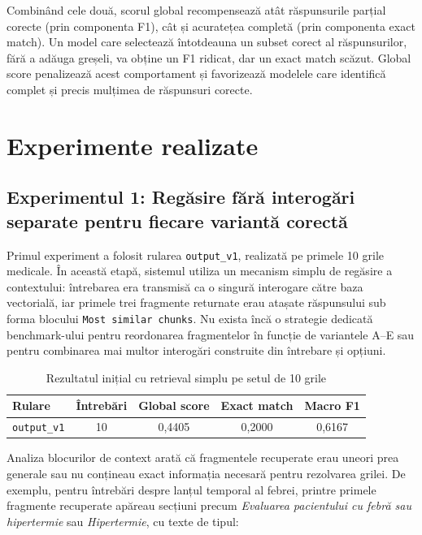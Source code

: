 \documentclass[12pt, a4paper, oneside, romanian]{teza-upb}
\begin{document}
Combinând cele două, scorul global recompensează atât răspunsurile parțial corecte (prin componenta F1), cât și acuratețea completă (prin componenta exact match). Un model care selectează întotdeauna un subset corect al răspunsurilor, fără a adăuga greșeli, va obține un F1 ridicat, dar un exact match scăzut. Global score penalizează acest comportament și favorizează modelele care identifică complet și precis mulțimea de răspunsuri corecte.




\section{Experimente realizate}


\subsection{Experimentul 1: Regăsire fără interogări separate pentru fiecare variantă corectă}

Primul experiment a folosit rularea \texttt{output\_v1}, realizată pe primele 10 grile medicale. În această etapă, sistemul utiliza un mecanism simplu de regăsire a contextului: întrebarea era transmisă ca o singură interogare către baza vectorială, iar primele trei fragmente returnate erau atașate răspunsului sub forma blocului \texttt{Most similar chunks}. Nu exista încă o strategie dedicată benchmark-ului pentru reordonarea fragmentelor în funcție de variantele A--E sau pentru combinarea mai multor interogări construite din întrebare și opțiuni.

\begin{table}[H]
\centering
\label{tab:experiment_initial_retrieval_v1}
\small
\begin{tabular}{lcccc}
\toprule
\textbf{Rulare} & \textbf{Întrebări} & \textbf{Global score} & \textbf{Exact match} & \textbf{Macro F1} \\
\midrule
\texttt{output\_v1} & 10 & 0,4405 & 0,2000 & 0,6167 \\
\bottomrule
\end{tabular}
\caption{Rezultatul inițial cu retrieval simplu pe setul de 10 grile}
\end{table}

Analiza blocurilor de context arată că fragmentele recuperate erau uneori prea generale sau nu conțineau exact informația necesară pentru rezolvarea grilei. De exemplu, pentru întrebări despre lanțul temporal al febrei, printre primele fragmente recuperate apăreau secțiuni precum \textit{Evaluarea pacientului cu febră sau hipertermie} sau \textit{Hipertermie}, cu texte de tipul:
\end{document}
